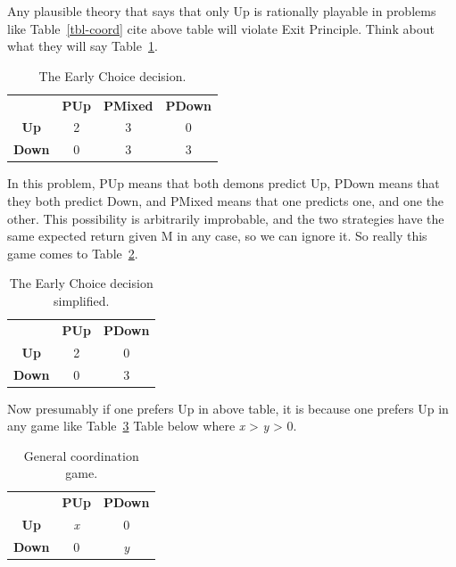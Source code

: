\documentclass[
  12pt,
  letterpaper,
  DIV=11,
  numbers=noendperiod]{scrreprt}
\begin{document}
Any plausible theory that says that only Up is rationally playable in
problems like Table~\ref{tbl-coord} cite above table will violate Exit
Principle. Think about what they will say Table~\ref{tbl-early-choice}.

\hypertarget{tbl-early-choice}{}
\begin{longtable}[]{@{}cccc@{}}
\caption{\label{tbl-early-choice}The Early Choice
decision.}\tabularnewline
\toprule\noalign{}
\endfirsthead
\endhead
\bottomrule\noalign{}
\endlastfoot
& \textbf{PUp} & \textbf{PMixed} & \textbf{PDown} \\
\textbf{Up} & 2 & 3 & 0 \\
\textbf{Down} & 0 & 3 & 3 \\
\end{longtable}

In this problem, PUp means that both demons predict Up, PDown means that
they both predict Down, and PMixed means that one predicts one, and one
the other. This possibility is arbitrarily improbable, and the two
strategies have the same expected return given M in any case, so we can
ignore it. So really this game comes to
Table~\ref{tbl-early-choice-simplified}.

\hypertarget{tbl-early-choice-simplified}{}
\begin{longtable}[]{@{}ccc@{}}
\caption{\label{tbl-early-choice-simplified}The Early Choice decision
simplified.}\tabularnewline
\toprule\noalign{}
\endfirsthead
\endhead
\bottomrule\noalign{}
\endlastfoot
& \textbf{PUp} & \textbf{PDown} \\
\textbf{Up} & 2 & 0 \\
\textbf{Down} & 0 & 3 \\
\end{longtable}

Now presumably if one prefers Up in above table, it is because one
prefers Up in any game like Table~\ref{tbl-general-coord} Table below
where \emph{x} \textgreater{} \emph{y} \textgreater{} 0.

\hypertarget{tbl-general-coord}{}
\begin{longtable}[]{@{}ccc@{}}
\caption{\label{tbl-general-coord}General coordination
game.}\tabularnewline
\toprule\noalign{}
\endfirsthead
\endhead
\bottomrule\noalign{}
\endlastfoot
& \textbf{PUp} & \textbf{PDown} \\
\textbf{Up} & \emph{x} & 0 \\
\textbf{Down} & 0 & \emph{y} \\
\end{longtable}
\end{document}
